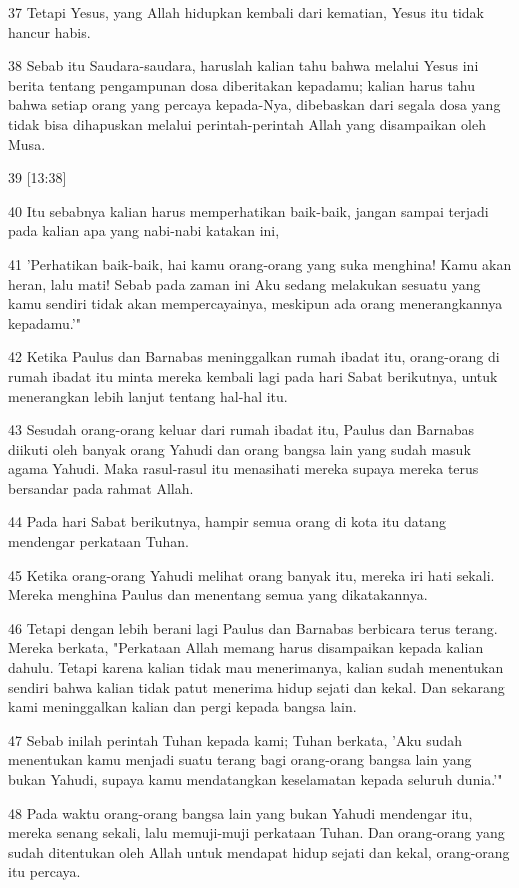 \par 37 Tetapi Yesus, yang Allah hidupkan kembali dari kematian, Yesus itu tidak hancur habis.
\par 38 Sebab itu Saudara-saudara, haruslah kalian tahu bahwa melalui Yesus ini berita tentang pengampunan dosa diberitakan kepadamu; kalian harus tahu bahwa setiap orang yang percaya kepada-Nya, dibebaskan dari segala dosa yang tidak bisa dihapuskan melalui perintah-perintah Allah yang disampaikan oleh Musa.
\par 39 [13:38]
\par 40 Itu sebabnya kalian harus memperhatikan baik-baik, jangan sampai terjadi pada kalian apa yang nabi-nabi katakan ini,
\par 41 'Perhatikan baik-baik, hai kamu orang-orang yang suka menghina! Kamu akan heran, lalu mati! Sebab pada zaman ini Aku sedang melakukan sesuatu yang kamu sendiri tidak akan mempercayainya, meskipun ada orang menerangkannya kepadamu.'"
\par 42 Ketika Paulus dan Barnabas meninggalkan rumah ibadat itu, orang-orang di rumah ibadat itu minta mereka kembali lagi pada hari Sabat berikutnya, untuk menerangkan lebih lanjut tentang hal-hal itu.
\par 43 Sesudah orang-orang keluar dari rumah ibadat itu, Paulus dan Barnabas diikuti oleh banyak orang Yahudi dan orang bangsa lain yang sudah masuk agama Yahudi. Maka rasul-rasul itu menasihati mereka supaya mereka terus bersandar pada rahmat Allah.
\par 44 Pada hari Sabat berikutnya, hampir semua orang di kota itu datang mendengar perkataan Tuhan.
\par 45 Ketika orang-orang Yahudi melihat orang banyak itu, mereka iri hati sekali. Mereka menghina Paulus dan menentang semua yang dikatakannya.
\par 46 Tetapi dengan lebih berani lagi Paulus dan Barnabas berbicara terus terang. Mereka berkata, "Perkataan Allah memang harus disampaikan kepada kalian dahulu. Tetapi karena kalian tidak mau menerimanya, kalian sudah menentukan sendiri bahwa kalian tidak patut menerima hidup sejati dan kekal. Dan sekarang kami meninggalkan kalian dan pergi kepada bangsa lain.
\par 47 Sebab inilah perintah Tuhan kepada kami; Tuhan berkata, 'Aku sudah menentukan kamu menjadi suatu terang bagi orang-orang bangsa lain yang bukan Yahudi, supaya kamu mendatangkan keselamatan kepada seluruh dunia.'"
\par 48 Pada waktu orang-orang bangsa lain yang bukan Yahudi mendengar itu, mereka senang sekali, lalu memuji-muji perkataan Tuhan. Dan orang-orang yang sudah ditentukan oleh Allah untuk mendapat hidup sejati dan kekal, orang-orang itu percaya.
